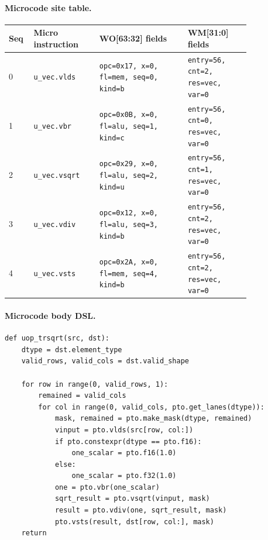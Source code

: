 \paragraph{Microcode site table.}
{\scriptsize
\begin{longtable}{@{}R{0.055\linewidth}L{0.23\linewidth}L{0.31\linewidth}L{0.22\linewidth}@{}}
\toprule
Seq & Micro instruction & WO[63:32] fields & WM[31:0] fields \\
 & \texttt{u\_vec.vlds} & \texttt{opc=0x17, x=0, fl=mem, seq=0, kind=b} & \texttt{entry=56, cnt=2, res=vec, var=0} \\
1 & \texttt{u\_vec.vbr} & \texttt{opc=0x0B, x=0, fl=alu, seq=1, kind=c} & \texttt{entry=56, cnt=0, res=vec, var=0} \\
2 & \texttt{u\_vec.vsqrt} & \texttt{opc=0x29, x=0, fl=alu, seq=2, kind=u} & \texttt{entry=56, cnt=1, res=vec, var=0} \\
3 & \texttt{u\_vec.vdiv} & \texttt{opc=0x12, x=0, fl=alu, seq=3, kind=b} & \texttt{entry=56, cnt=2, res=vec, var=0} \\
4 & \texttt{u\_vec.vsts} & \texttt{opc=0x2A, x=0, fl=mem, seq=4, kind=b} & \texttt{entry=56, cnt=2, res=vec, var=0} \\
\bottomrule
\end{longtable}
}
\paragraph{Microcode body DSL.}
\begin{lstlisting}[style=ptocode]
def uop_trsqrt(src, dst):
    dtype = dst.element_type
    valid_rows, valid_cols = dst.valid_shape

    for row in range(0, valid_rows, 1):
        remained = valid_cols
        for col in range(0, valid_cols, pto.get_lanes(dtype)):
            mask, remained = pto.make_mask(dtype, remained)
            vinput = pto.vlds(src[row, col:])
            if pto.constexpr(dtype == pto.f16):
                one_scalar = pto.f16(1.0)
            else:
                one_scalar = pto.f32(1.0)
            one = pto.vbr(one_scalar)
            sqrt_result = pto.vsqrt(vinput, mask)
            result = pto.vdiv(one, sqrt_result, mask)
            pto.vsts(result, dst[row, col:], mask)
    return
\end{lstlisting}
\Needspace{0.34\textheight}
